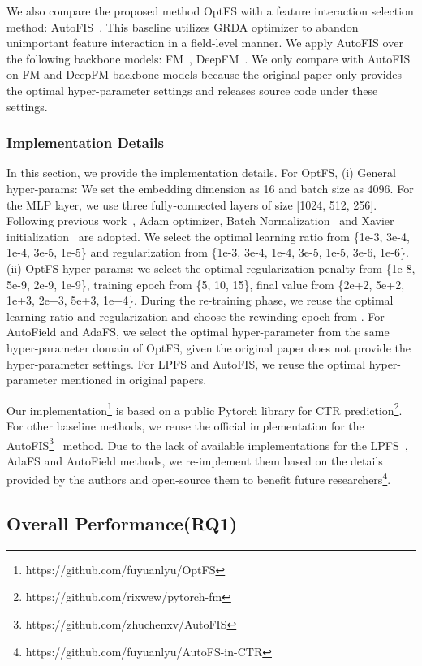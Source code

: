 \documentclass[sigconf]{acmart}
\begin{document}
We also compare the proposed method OptFS with a feature interaction selection method: AutoFIS~\cite{AutoFIS}. This baseline utilizes GRDA optimizer to abandon unimportant feature interaction in a field-level manner. We apply AutoFIS over the following backbone models: FM~\cite{FM}, DeepFM~\cite{DeepFM}. We only compare with AutoFIS on FM and DeepFM backbone models because the original paper only provides the optimal hyper-parameter settings and releases source code under these settings.

\subsubsection{Implementation Details}
In this section, we provide the implementation details. For OptFS, (i) General hyper-params: We set the embedding dimension as 16 and batch size as 4096. For the MLP layer, we use three fully-connected layers of size [1024, 512, 256]. Following previous work~\cite{IPNN}, Adam optimizer, Batch Normalization~\cite{BatchNorm} and Xavier initialization~\cite{Xavier} are adopted. We select the optimal learning ratio from \{1e-3, 3e-4, 1e-4, 3e-5, 1e-5\} and  regularization from \{1e-3, 3e-4, 1e-4, 3e-5, 1e-5, 3e-6, 1e-6\}. (ii) OptFS hyper-params: we select the optimal regularization penalty  from \{1e-8, 5e-9, 2e-9, 1e-9\}, training epoch  from \{5, 10, 15\}, final value  from \{2e+2, 5e+2, 1e+3, 2e+3, 5e+3, 1e+4\}. During the re-training phase, we reuse the optimal learning ratio and  regularization and choose the rewinding epoch  from .
For AutoField and AdaFS, we select the optimal hyper-parameter from the same hyper-parameter domain of OptFS, given the original paper does not provide the hyper-parameter settings. For LPFS and AutoFIS, we reuse the optimal hyper-parameter mentioned in original papers.

Our implementation\footnote{https://github.com/fuyuanlyu/OptFS} is based on a public Pytorch library for CTR prediction\footnote{https://github.com/rixwew/pytorch-fm}. For other baseline methods, we reuse the official implementation for the AutoFIS\footnote{https://github.com/zhuchenxv/AutoFIS}~\cite{AutoFIS} method. Due to the lack of available implementations for the LPFS~\cite{LPFS}, AdaFS\cite{AdaFS} and AutoField\cite{AutoField} methods, we re-implement them based on the details provided by the authors and open-source them to benefit future researchers\footnote{https://github.com/fuyuanlyu/AutoFS-in-CTR}.

\subsection{Overall Performance(RQ1)}
\end{document}
